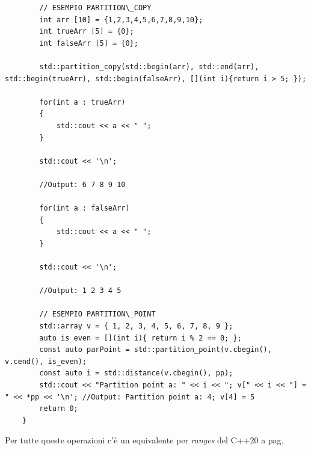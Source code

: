 \begin{lstlisting}
		// ESEMPIO PARTITION\_COPY
		int arr [10] = {1,2,3,4,5,6,7,8,9,10};
		int trueArr [5] = {0};
		int falseArr [5] = {0};
		
		std::partition_copy(std::begin(arr), std::end(arr), std::begin(trueArr), std::begin(falseArr), [](int i){return i > 5; });
		
		for(int a : trueArr)
		{
			std::cout << a << " ";
		}
		
		std::cout << '\n';
		
		//Output: 6 7 8 9 10
		
		for(int a : falseArr)
		{
			std::cout << a << " ";
		}
		
		std::cout << '\n';
		
		//Output: 1 2 3 4 5
		
		// ESEMPIO PARTITION\_POINT
		std::array v = { 1, 2, 3, 4, 5, 6, 7, 8, 9 };
		auto is_even = [](int i){ return i % 2 == 0; };
		const auto parPoint = std::partition_point(v.cbegin(), v.cend(), is_even);
		const auto i = std::distance(v.cbegin(), pp);
		std::cout << "Partition point a: " << i << "; v[" << i << "] = " << *pp << '\n'; //Output: Partition point a: 4; v[4] = 5
		return 0;
	}
\end{lstlisting}

\fleuron

\textsf{\small Per tutte queste operazioni c'è un equivalente per \emph{ranges} del C++20 a pag. \pageref{ranges}} \\







